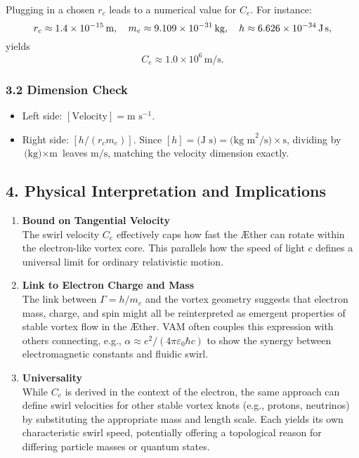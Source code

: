 \documentclass[aps,preprint,superscriptaddress]{revtex4-2}
\begin{document}
    Plugging in a chosen \(r_c\) leads to a numerical value for \(C_e\). For instance:
    \[
        r_c \approx 1.4 \times 10^{-15}\,\text{m}, \quad m_e \approx 9.109 \times 10^{-31}\,\text{kg}, \quad h \approx 6.626 \times 10^{-34}\,\text{J\,s},
    \]
    yields
    \[
        C_e \approx 1.0 \times 10^6 \,\text{m/s}.
    \]

    \subsubsection*{3.2 Dimension Check}

    \begin{itemize}
        \item Left side: \([\text{Velocity}] = \text{m s}^{-1}\).
        \item Right side: \([h/(r_c m_e)]\). Since \([h] = \text{(J s)} = \text{(kg m}^2\text{/s)}\times\text{s}\), dividing by \(\text{(kg)} \times \text{m}\) leaves \(\text{m}/\text{s}\), matching the velocity dimension exactly.
    \end{itemize}

    \subsection*{4. Physical Interpretation and Implications}

    \begin{enumerate}
        \item \textbf{Bound on Tangential Velocity} \\
    The swirl velocity \(C_e\) effectively caps how fast the Æther can rotate within the electron-like vortex core. This parallels how the speed of light \(c\) defines a universal limit for ordinary relativistic motion.
        \item \textbf{Link to Electron Charge and Mass} \\
    The link between \(\Gamma = h/m_e\) and the vortex geometry suggests that electron mass, charge, and spin might all be reinterpreted as emergent properties of stable vortex flow in the Æther. VAM often couples this expression with others connecting, e.g., \(\alpha\approx e^2/(4\pi\varepsilon_0\hbar c)\) to show the synergy between electromagnetic constants and fluidic swirl.
        \item \textbf{Universality} \\
    While \(C_e\) is derived in the context of the electron, the same approach can define swirl velocities for other stable vortex knots (e.g., protons, neutrinos) by substituting the appropriate mass and length scale. Each yields its own characteristic swirl speed, potentially offering a topological reason for differing particle masses or quantum states.
    \end{enumerate}
\end{document}
